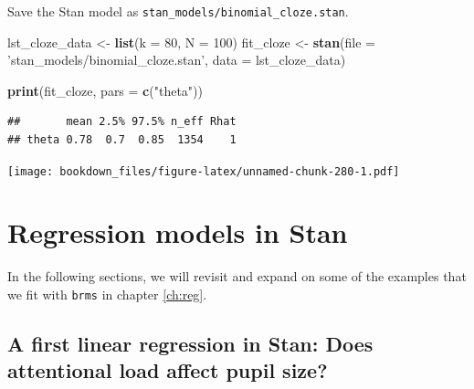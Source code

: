 \documentclass[12pt,]{krantz}
\newenvironment{Shaded}{\begin{snugshade}}{\end{snugshade}}
\newcommand{\KeywordTok}[1]{\textcolor[rgb]{0.13,0.29,0.53}{\textbf{#1}}}
\newcommand{\DataTypeTok}[1]{\textcolor[rgb]{0.13,0.29,0.53}{#1}}
\newcommand{\DecValTok}[1]{\textcolor[rgb]{0.00,0.00,0.81}{#1}}
\newcommand{\StringTok}[1]{\textcolor[rgb]{0.31,0.60,0.02}{#1}}
\newcommand{\OperatorTok}[1]{\textcolor[rgb]{0.81,0.36,0.00}{\textbf{#1}}}
\newcommand{\NormalTok}[1]{#1}
\theoremstyle{definition}
\theoremstyle{definition}
\theoremstyle{definition}
\theoremstyle{remark}
\begin{document}
Save the Stan model as \texttt{stan\_models/binomial\_cloze.stan}.

\begin{Shaded}
\begin{Highlighting}[]
\NormalTok{lst_cloze_data <-}\StringTok{  }\KeywordTok{list}\NormalTok{(}\DataTypeTok{k =} \DecValTok{80}\NormalTok{, }\DataTypeTok{N =} \DecValTok{100}\NormalTok{)}
\NormalTok{fit_cloze <-}\StringTok{ }\KeywordTok{stan}\NormalTok{(}\DataTypeTok{file =} \StringTok{'stan_models/binomial_cloze.stan'}\NormalTok{,}
                  \DataTypeTok{data =}\NormalTok{ lst_cloze_data)}
\end{Highlighting}
\end{Shaded}

\begin{Shaded}
\begin{Highlighting}[]
\KeywordTok{print}\NormalTok{(fit_cloze, }\DataTypeTok{pars =} \KeywordTok{c}\NormalTok{(}\StringTok{"theta"}\NormalTok{)) }
\end{Highlighting}
\end{Shaded}

\begin{verbatim}
##       mean 2.5% 97.5% n_eff Rhat
## theta 0.78  0.7  0.85  1354    1
\end{verbatim}

\begin{Shaded}
\end{Shaded}

\texttt{[image: bookdown\_files/figure-latex/unnamed-chunk-280-1.pdf]}

\section{Regression models in Stan}\label{regression-models-in-stan}

In the following sections, we will revisit and expand on some of the
examples that we fit with \texttt{brms} in chapter \ref{ch:reg}.

\subsection{A first linear regression in Stan: Does attentional load
affect pupil size?}\label{sec:pupilstan}
\end{document}
